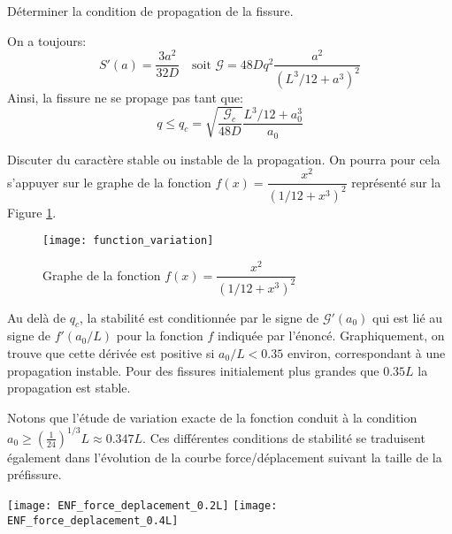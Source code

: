 \begin{questions}
\setcounter{question}{5}
\question Déterminer la condition de propagation de la fissure. 
\begin{solution}
On a toujours:
$$S'(a) = \dfrac{3a^2}{32D} \quad \text{soit } \mathcal{G}=48Dq^2\dfrac{a^2}{(L^3/12+a^3)^2}$$
Ainsi, la fissure ne se propage pas tant que:
$$q \leq q_c = \sqrt{\dfrac{\mathcal{G}_c}{48D}}\dfrac{L^3/12+a_0^3}{a_0}$$
\end{solution}
\question Discuter du caractère stable ou instable de la propagation. On pourra pour cela s'appuyer sur le graphe de la fonction $f(x) = \dfrac{x^2}{(1/12+x^3)^2}$ représenté sur la Figure \ref{fig:graphe-fonction}.
\begin{figure}
\begin{center}
\texttt{[image: function\_variation]}
\end{center}
\caption{Graphe de la fonction $f(x) = \dfrac{x^2}{(1/12+x^3)^2}$}\label{fig:graphe-fonction}
\end{figure}
\begin{solution}
Au delà de $q_c$, la stabilité est conditionnée par le signe de $\mathcal{G}'(a_0)$ qui est lié au signe de $f'(a_0/L)$ pour la fonction $f$ indiquée par l'énoncé. Graphiquement, on trouve que cette dérivée est positive si $a_0/L < 0.35$ environ, correspondant à une propagation instable. Pour des fissures initialement plus grandes que $0.35L$ la propagation est stable.

Notons que l'étude de variation exacte de la fonction conduit à la condition $a_0 \geq \left(\frac{1}{24}\right)^{1/3}L \approx 0.347L$. Ces différentes conditions de stabilité se traduisent également dans l'évolution de la courbe force/déplacement suivant la taille de la préfissure.

\begin{R_figure}
\texttt{[image: ENF\_force\_deplacement\_0.2L]}
\texttt{[image: ENF\_force\_deplacement\_0.4L]}\\
\end{R_figure}

\end{solution}
\end{questions}
